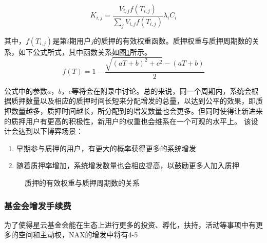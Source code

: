\begin{equation}
  K_{i,j} = \frac{V_{i,j} f(T_{i,j})}{\sum_j V_{i,j} f(T_{i,j})} \lambda_i C_i
\end{equation}



其中，\(f(T_{i,j})\)是第\(i\)期用户\(j\)的质押的有效权重函数。质押权重与质押周期数的关系，如下公式所式，其中函数关系如图\ref{weight}所示。
  \begin{equation}
    f(T) = 1 - \frac{\sqrt{(aT+b)^2+c^2}-(aT+b)}{2}
  \end{equation}

公式中的参数$a$，$b$，$c$等将会在附录中讨论。总的来说，同一个周期内，系统会根据质押数量以及相应的质押时间长短来分配增发的总量，以达到公平的效果，即质押数量越多，质押时间越长，所分配到的增发数量也会更多。但同时使得让新进来的质押用户有更高的积极性，新用户的权重也会维系在一个可观的水平上。 该设计会达到以下博弈场景：

\begin{enumerate}[\hspace{1cm}(a)]
  \item 早期参与质押的用户，有更大的概率获得更多的系统增发
  \item 随着质押率增加，系统增发数量也会相应提高，以鼓励更多人加入质押
\end{enumerate}

\begin{figure}
\centering
    \caption{质押的有效权重与质押周期数的关系}\label{weight}
\end{figure}

\subsubsection{基金会增发手续费}
为了使得星云基金会能在生态上进行更多的投资、孵化，扶持，活动等事项中有更多的空间和主动权，NAX的增发中将有4-5%



